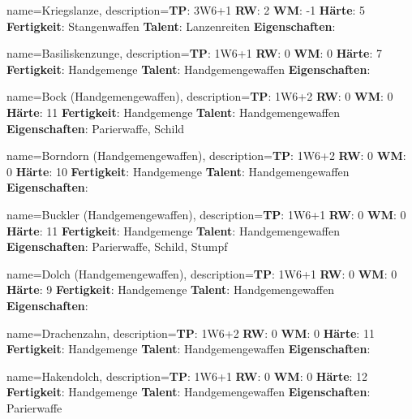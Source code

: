 {
    name={Kriegslanze},
    description={\textbf{TP}: 3W6+1 \textbf{RW}: 2 \textbf{WM}: -1 \textbf{Härte}: 5        \textbf{Fertigkeit}: Stangenwaffen \textbf{Talent}: Lanzenreiten \textbf{{Eigenschaften}}: }
}



{
    name={Basiliskenzunge},
    description={\textbf{TP}: 1W6+1 \textbf{RW}: 0 \textbf{WM}: 0 \textbf{Härte}: 7        \textbf{Fertigkeit}: Handgemenge \textbf{Talent}: Handgemengewaffen \textbf{{Eigenschaften}}: }
}



{
    name={Bock (Handgemengewaffen)},
    description={\textbf{TP}: 1W6+2 \textbf{RW}: 0 \textbf{WM}: 0 \textbf{Härte}: 11        \textbf{Fertigkeit}: Handgemenge \textbf{Talent}: Handgemengewaffen \textbf{{Eigenschaften}}: Parierwaffe, Schild}
}



{
    name={Borndorn (Handgemengewaffen)},
    description={\textbf{TP}: 1W6+2 \textbf{RW}: 0 \textbf{WM}: 0 \textbf{Härte}: 10        \textbf{Fertigkeit}: Handgemenge \textbf{Talent}: Handgemengewaffen \textbf{{Eigenschaften}}: }
}



{
    name={Buckler (Handgemengewaffen)},
    description={\textbf{TP}: 1W6+1 \textbf{RW}: 0 \textbf{WM}: 0 \textbf{Härte}: 11        \textbf{Fertigkeit}: Handgemenge \textbf{Talent}: Handgemengewaffen \textbf{{Eigenschaften}}: Parierwaffe, Schild, Stumpf}
}



{
    name={Dolch (Handgemengewaffen)},
    description={\textbf{TP}: 1W6+1 \textbf{RW}: 0 \textbf{WM}: 0 \textbf{Härte}: 9        \textbf{Fertigkeit}: Handgemenge \textbf{Talent}: Handgemengewaffen \textbf{{Eigenschaften}}: }
}



{
    name={Drachenzahn},
    description={\textbf{TP}: 1W6+2 \textbf{RW}: 0 \textbf{WM}: 0 \textbf{Härte}: 11        \textbf{Fertigkeit}: Handgemenge \textbf{Talent}: Handgemengewaffen \textbf{{Eigenschaften}}: }
}



{
    name={Hakendolch},
    description={\textbf{TP}: 1W6+1 \textbf{RW}: 0 \textbf{WM}: 0 \textbf{Härte}: 12        \textbf{Fertigkeit}: Handgemenge \textbf{Talent}: Handgemengewaffen \textbf{{Eigenschaften}}: Parierwaffe}
}



